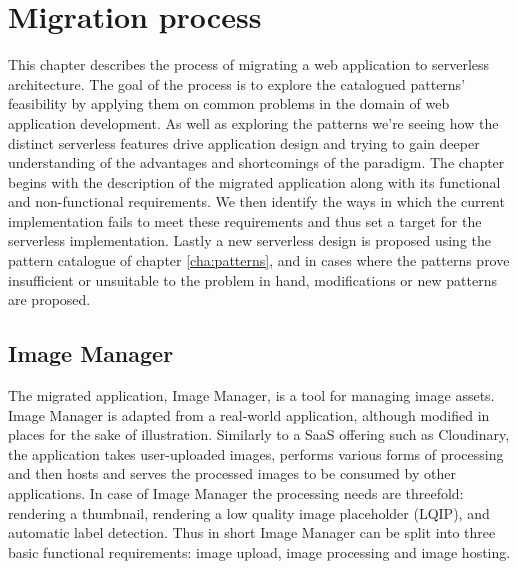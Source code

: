 \chapter{Migration process} \label{cha:migration}

This chapter describes the process of migrating a web application to serverless architecture. The goal of the process is to explore the catalogued patterns' feasibility by applying them on common problems in the domain of web application development. As well as exploring the patterns we're seeing how the distinct serverless features drive application design and trying to gain deeper understanding of the advantages and shortcomings of the paradigm. The chapter begins with the description of the migrated application along with its functional and non-functional requirements. We then identify the ways in which the current implementation fails to meet these requirements and thus set a target for the serverless implementation. Lastly a new serverless design is proposed using the pattern catalogue of chapter \ref{cha:patterns}, and in cases where the patterns prove insufficient or unsuitable to the problem in hand, modifications or new patterns are proposed.

\section{Image Manager}

The migrated application, Image Manager, is a tool for managing image assets. Image Manager is adapted from a real-world application, although modified in places for the sake of illustration. Similarly to a SaaS offering such as Cloudinary, the application takes user-uploaded images, performs various forms of processing and then hosts and serves the processed images to be consumed by other applications. In case of Image Manager the processing needs are threefold: rendering a thumbnail, rendering a low quality image placeholder (LQIP), and automatic label detection. Thus in short Image Manager can be split into three basic functional requirements: image upload, image processing and image hosting.

